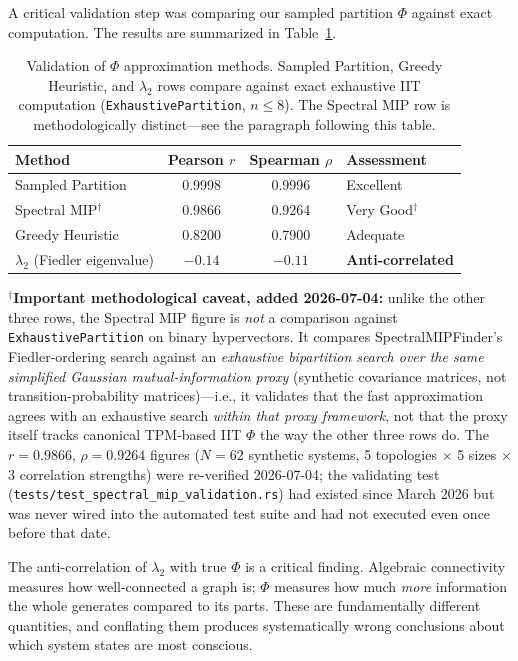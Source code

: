 \documentclass[12pt]{book}
\begin{document}
A critical validation step was comparing our sampled partition $\Phi$ against exact computation. The results are summarized in Table~\ref{tab:phi-validation}.

\begin{table}[H]
\centering
\caption{Validation of $\Phi$ approximation methods. Sampled Partition, Greedy Heuristic, and $\lambda_2$ rows compare against exact exhaustive IIT computation (\texttt{ExhaustivePartition}, $n \leq 8$). The Spectral MIP row is methodologically distinct---see the paragraph following this table.}
\label{tab:phi-validation}
\begin{tabular}{lccl}
\toprule
\textbf{Method} & \textbf{Pearson $r$} & \textbf{Spearman $\rho$} & \textbf{Assessment} \\
\midrule
Sampled Partition & 0.9998 & 0.9996 & Excellent \\
Spectral MIP$^\dagger$ & 0.9866 & 0.9264 & Very Good$^\dagger$ \\
Greedy Heuristic & 0.8200 & 0.7900 & Adequate \\
$\lambda_2$ (Fiedler eigenvalue) & $-0.14$ & $-0.11$ & \textbf{Anti-correlated} \\
\bottomrule
\end{tabular}
\end{table}

$^\dagger$\textbf{Important methodological caveat, added 2026-07-04:} unlike the other three rows, the Spectral MIP figure is \textit{not} a comparison against \texttt{ExhaustivePartition} on binary hypervectors. It compares SpectralMIPFinder's Fiedler-ordering search against an \textit{exhaustive bipartition search over the same simplified Gaussian mutual-information proxy} (synthetic covariance matrices, not transition-probability matrices)---i.e., it validates that the fast approximation agrees with an exhaustive search \textit{within that proxy framework}, not that the proxy itself tracks canonical TPM-based IIT $\Phi$ the way the other three rows do. The $r=0.9866$, $\rho=0.9264$ figures ($N=62$ synthetic systems, 5 topologies $\times$ 5 sizes $\times$ 3 correlation strengths) were re-verified 2026-07-04; the validating test (\texttt{tests/test\_spectral\_mip\_validation.rs}) had existed since March 2026 but was never wired into the automated test suite and had not executed even once before that date.

The anti-correlation of $\lambda_2$ with true $\Phi$ is a critical finding. Algebraic connectivity measures how well-connected a graph is; $\Phi$ measures how much \textit{more} information the whole generates compared to its parts. These are fundamentally different quantities, and conflating them produces systematically wrong conclusions about which system states are most conscious.
\end{document}
